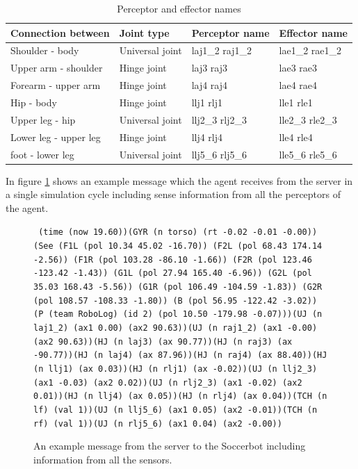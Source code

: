 \begin{table}
\label{table:perceptorNames}
\caption{Perceptor and effector names}
\begin{center}
\begin{tabular}{|l|l|l|l|}
\hline
{\bf Connection between}  & {\bf Joint type} & {\bf Perceptor name}& {\bf
Effector name} \\
\hline
Shoulder - body  & Universal joint & laj1\_2  raj1\_2 & lae1\_2   rae1\_2 \\
\hline
Upper arm - shoulder  & Hinge joint & laj3  raj3 & lae3   rae3 \\
\hline
Forearm - upper arm  & Hinge joint & laj4  raj4 & lae4   rae4 \\
\hline
Hip - body  & Hinge joint & llj1  rlj1 & lle1   rle1 \\
\hline
Upper leg - hip & Universal joint & llj2\_3  rlj2\_3 & lle2\_3   rle2\_3 \\
\hline
Lower leg - upper leg & Hinge joint & llj4  rlj4 & lle4   rle4 \\
\hline
foot - lower leg & Universal joint & llj5\_6  rlj5\_6 & lle5\_6   rle5\_6 \\
\hline
\end{tabular}
\end{center}
\end{table}

In figure \ref{fig:examplemsg} shows an example message which the agent receives from the server in a single simulation cycle including sense information from all the perceptors of the agent.

\begin{figure}[htb]
\centering
\parbox{\textwidth}{
\texttt{
(time (now 19.60))(GYR (n torso) (rt -0.02 -0.01 -0.00))(See (F1L (pol 10.34 45.02 -16.70)) (F2L (pol 68.43 174.14 -2.56)) (F1R (pol 103.28 -86.10 -1.66)) (F2R (pol 123.46 -123.42 -1.43)) (G1L (pol 27.94 165.40 -6.96)) (G2L (pol 35.03 168.43 -5.56)) (G1R (pol 106.49 -104.59 -1.83)) (G2R (pol 108.57 -108.33 -1.80)) (B (pol 56.95 -122.42 -3.02)) (P (team RoboLog) (id 2) (pol 10.50 -179.98 -0.07)))(UJ (n laj1\_2) (ax1 0.00) (ax2 90.63))(UJ (n raj1\_2) (ax1 -0.00) (ax2 90.63))(HJ (n laj3) (ax 90.77))(HJ (n raj3) (ax -90.77))(HJ (n laj4) (ax 87.96))(HJ (n raj4) (ax 88.40))(HJ (n llj1) (ax 0.03))(HJ (n rlj1) (ax -0.02))(UJ (n llj2\_3) (ax1 -0.03) (ax2 0.02))(UJ (n rlj2\_3) (ax1 -0.02) (ax2 0.01))(HJ (n llj4) (ax 0.05))(HJ (n rlj4) (ax 0.04))(TCH (n lf) (val 1))(UJ (n llj5\_6) (ax1 0.05) (ax2 -0.01))(TCH (n rf) (val 1))(UJ (n rlj5\_6) (ax1 0.04) (ax2 -0.00))}
}
\caption{An example message from the server to the Soccerbot including information from all the sensors.}
\label{fig:examplemsg}
\end{figure}

